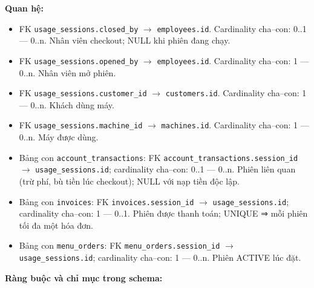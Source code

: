 \textbf{Quan hệ:}

\begin{itemize}

\item FK \texttt{usage\_sessions.closed\_by} $\rightarrow$ \texttt{employees.id}. Cardinality cha--con: 0..1 — 0..n. Nhân viên checkout; NULL khi phiên đang chạy.

\item FK \texttt{usage\_sessions.opened\_by} $\rightarrow$ \texttt{employees.id}. Cardinality cha--con: 1 — 0..n. Nhân viên mở phiên.

\item FK \texttt{usage\_sessions.customer\_id} $\rightarrow$ \texttt{customers.id}. Cardinality cha--con: 1 — 0..n. Khách dùng máy.

\item FK \texttt{usage\_sessions.machine\_id} $\rightarrow$ \texttt{machines.id}. Cardinality cha--con: 1 — 0..n. Máy được dùng.

\item Bảng con \texttt{account\_transactions}: FK \texttt{account\_transactions.session\_id} $\rightarrow$ \texttt{usage\_sessions.id}; cardinality cha--con: 0..1 — 0..n. Phiên liên quan (trừ phí, bù tiền lúc checkout); NULL với nạp tiền độc lập.

\item Bảng con \texttt{invoices}: FK \texttt{invoices.session\_id} $\rightarrow$ \texttt{usage\_sessions.id}; cardinality cha--con: 1 — 0..1. Phiên được thanh toán; UNIQUE ⇒ mỗi phiên tối đa một hóa đơn.

\item Bảng con \texttt{menu\_orders}: FK \texttt{menu\_orders.session\_id} $\rightarrow$ \texttt{usage\_sessions.id}; cardinality cha--con: 1 — 0..n. Phiên ACTIVE lúc đặt.

\end{itemize}

\textbf{Ràng buộc và chỉ mục trong schema:}

